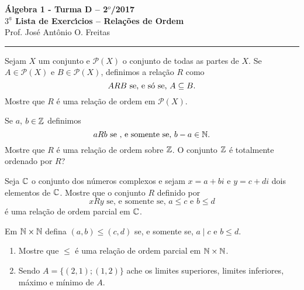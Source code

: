 \documentclass[12pt]{article}
\begin{document}


\begin{center}
{\Large\bf {\'A}lgebra 1 - Turma D -- 2$^{o}$/2017} \\ \vspace{9pt} {\large\bf
  $3^{\underline{a}}$ Lista de Exerc{\'\i}cios -- Rela\c{c}\~oes de Ordem}\\
\vspace{9pt} Prof. Jos{\'e} Ant{\^o}nio O. Freitas
\end{center}
\hrule

\vspace{.6cm}

\questao Sejam $X$ um conjunto e $\mathcal{P}(X)$ o conjunto de todas as partes de $X$. Se $A \in \mathcal{P}(X)$ e $B \in \mathcal{P}(X)$, definimos a relação $R$ como
\[
	ARB \mbox{ se, e só se, } A \subseteq B.
\]
Mostre que $R$ é uma relação de ordem em $\mathcal{P}(X)$.

\vesp

\questao Se $a$, $b \in \mathbb{Z}$ definimos
\[
	aRb \mbox{ se , e somente se, } b - a \in \mathbb{N}.
\]
Mostre que $R$ é uma relação de ordem sobre $\mathbb{Z}$. O conjunto $\mathbb{Z}$ é totalmente ordenado por $R$?

\vesp

\questao Seja $\mathbb{C}$ o conjunto dos números complexos e sejam $x = a + bi$ e $y = c + di$ dois elementos de $\mathbb{C}$.
Mostre que o conjunto $R$ definido por
\[
	xRy \mbox{ se, e somente se, } a \leqslant c \mbox{ e } b \leqslant d
\]
é uma relação de ordem parcial em $\mathbb{C}$.

\vesp

\questao Em $\mathbb{N} \times \mathbb{N}$ defina $(a,b) \leqslant (c, d)$ se, e somente se, $a \mid c$ e $b \leqslant d$.
\begin{enumerate}[label={\alph*})]
	\item Mostre que $\leqslant$ é uma relação de ordem parcial em $\mathbb{N} \times \mathbb{N}$.
	\item Sendo $A = \{(2,1);(1,2)\}$ ache os limites superiores, limites inferiores, máximo e mínimo de $A$.
\end{enumerate}

\vesp
\end{document}
